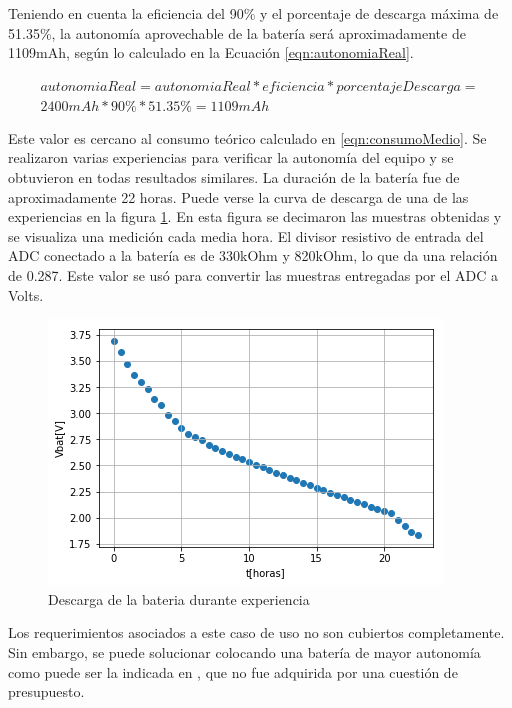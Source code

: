 Teniendo en cuenta la eficiencia del 90\% y el porcentaje de descarga máxima de 51.35\%, la autonomía aprovechable de la batería será aproximadamente de 1109mAh, según lo calculado en la Ecuación \ref{eqn:autonomiaReal}.


\begin{equation} \label{eqn:autonomiaReal}
\begin{split}
autonomiaReal = autonomiaReal*eficiencia*porcentajeDescarga = \\ 2400mAh * 90\% * 51.35\% = 1109 mAh
\end{split}
\end{equation}

Este valor es cercano al consumo teórico calculado en \ref{eqn:consumoMedio}.
Se realizaron varias experiencias para verificar la autonomía del equipo y se obtuvieron en todas resultados similares. La duración de la batería fue de aproximadamente 22 horas. Puede verse la curva de descarga de una de las experiencias en la figura \ref{fig:descargaBateria}. En esta figura se decimaron las muestras obtenidas y se visualiza una medición cada media hora. El divisor resistivo de entrada del ADC conectado a la batería es de 330kOhm y 820kOhm, lo que da una relación de 0.287. Este valor se usó para convertir las muestras entregadas por el ADC a Volts.

\begin{figure} [!htpb]
    \centering
    \includegraphics[width=\textwidth]{./Figures/descargaBateria.png}
    \caption{Descarga de la bateria durante experiencia}
    \label{fig:descargaBateria}
\end{figure}

Los requerimientos asociados a este caso de uso no son cubiertos completamente. Sin embargo, se puede solucionar colocando una batería de mayor autonomía como puede ser la indicada en \citep{rs2019}, que no fue adquirida por una cuestión de presupuesto.


